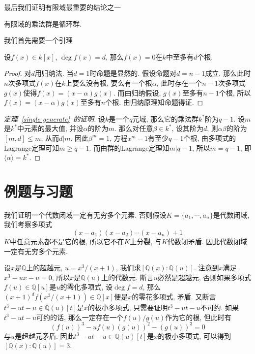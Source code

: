 最后我们证明有限域最重要的结论之一
\begin{thm}\label{single generate}
    有限域的乘法群是循环群.
\end{thm}

我们首先需要一个引理
\begin{lem}[多项式的Lagrange定理]
    设$f(x)\in k[x]$, $\deg f(x)=d$, 那么$f(x)=0$在$k$中至多有$d$个根.
\end{lem}
\begin{proof}
    对$d$用归纳法.
    当$d=1$时命题是显然的.
    假设命题对$d=n-1$成立, 那么此时$n$次多项式$f(x)$在$k$上要么没有根, 要么有一个根$\alpha$, 此时存在一个$n-1$次多项式$g(x)$使得$f(x)=(x-\alpha)g(x)$.
    而由归纳假设, $g(x)$至多有$n-1$个根, 所以$f(x)=(x-\alpha)g(x)$至多有$n$个根.
    由归纳原理知命题得证.
\end{proof}

\begin{proof}[定理~\ref{single generate}~的证明]
    设$k$是一个$q$元域, 那么它的乘法群$k^*$阶为$q-1$.
    设$m$是$k^*$中元素的最大值, 并设$\alpha$的阶为$m$.
    那么对任意$\beta\in k^*$, 设其阶为$d$, 则$\alpha\beta$的阶为$[m,d]\leq m$, 从而$d|m$.
    因此$\beta^m=1$, 方程$x^m-1$有至少$q-1$个根, 由多项式的Lagrange定理可知$m\geq q-1$.
    而由群的Lagrange定理知$m|q-1$, 所以$m=q-1$, 即$\langle\alpha\rangle=k^*$.
\end{proof}

\section{例题与习题}

\begin{eg}
    我们证明一个代数闭域一定有无穷多个元素.
    否则假设$K=\{a_1,\cdots,a_n\}$是代数闭域, 我们考察多项式
    \[(x-a_1)(x-a_2)\cdots(x-a_n)+1\]
    $K$中任意元素都不是它的根, 所以它不在$K$上分裂, 与$K$代数闭矛盾.
    因此代数闭域一定有无穷多个元素.
\end{eg}

\begin{eg}
    设$x$是$\mathbb{Q}$上的超越元, $u=x^3/(x+1)$, 我们求$[\mathbb{Q}(x):\mathbb{Q}(u)]$.
    注意到$x$满足$x^3-ux-u=0$, 所以$x$是$\mathbb{Q}(u)$上的代数元.
    断言$u$必然是超越元, 否则如果多项式$f(u)\in\mathbb{Q}[u]$是$u$的零化多项式, 设$\deg f=d$, 那么$(x+1)^df(x^3/(x+1))\in\mathbb{Q}[x]$便是$x$的零花多项式, 矛盾.
    又断言$t^3-ut-u\in\mathbb{Q}(u)[t]$是$x$的极小多项式, 只需要证明$t^3-ut-u$不可约.
    如果$t^3-ut-u$可约的话, 那么一定存在一个$f(u)/g(u)$作为它的根, 但此时有
    \[(f(u))^3-uf(u)(g(u))^2-(g(u))^3=0\]
    与$u$是超越元矛盾.
    因此$t^3-ut-u\in\mathbb{Q}(u)[t]$是$x$的极小多项式, 可以得到$[\mathbb{Q}(x):\mathbb{Q}(u)]=3$.
\end{eg}

